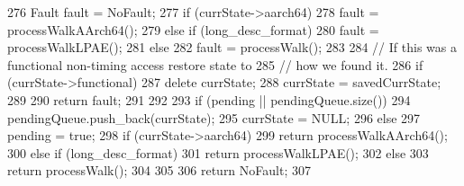 \begin{DoxyCode}
{{276         Fault fault = NoFault;
277         if (currState->aarch64)
278             fault = processWalkAArch64();
279         else if (long_desc_format)
280             fault = processWalkLPAE();
281         else
282             fault = processWalk();
283 
284         // If this was a functional non-timing access restore state to
285         // how we found it.
286         if (currState->functional) {
287             delete currState;
288             currState = savedCurrState;
289         }
290         return fault;
291     }
292 
293     if (pending || pendingQueue.size()) {
294         pendingQueue.push_back(currState);
295         currState = NULL;
296     } else {
297         pending = true;
298         if (currState->aarch64)
299             return processWalkAArch64();
300         else if (long_desc_format)
301             return processWalkLPAE();
302         else
303             return processWalk();
304     }
305 
306     return NoFault;
307 }
\end{DoxyCode}


